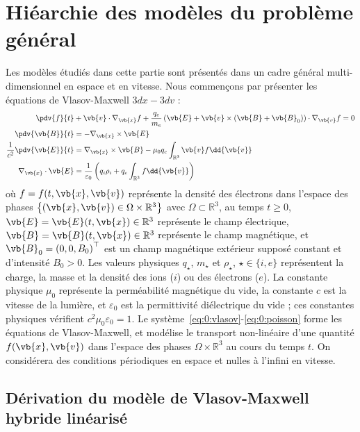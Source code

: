 
\section{Hiéarchie des modèles du problème général}

Les modèles étudiés dans cette partie sont présentés dans un cadre général multi-dimensionnel en espace et en vitesse. Nous commençons par présenter les équations de Vlasov-Maxwell $3dx-3dv$ :
\begin{align}
  \label{eq:0:vlasov}
    \pdv{f}{t} &+ \vb{v}\cdot\nabla_{\vb{x}} f + \frac{q_e}{m_e}\left( \vb{E} + \vb{v}\times(\vb{B}+\vb{B}_0) \right)\cdot\nabla_{\vb{v}} f = 0 \\
  \label{eq:0:maxwellB}
    \pdv{\vb{B}}{t} &= - \nabla_{\vb{x}}\times\vb{E} \\
  \label{eq:0:maxwellE}
    \frac{1}{c^2}\pdv{\vb{E}}{t} &= \nabla_{\vb{x}}\times \vb{B} - \mu_0 q_e\int_{\mathbb{R}^3} \vb{v} f\dd{\vb{v}} \\
  \label{eq:0:poisson}
    \nabla_{\vb{x}}\cdot\vb{E} &= \frac{1}{\varepsilon_0}\left( q_i\rho_i + q_e\int_{\mathbb{R}^3} f\dd{\vb{v}} \right)
\end{align}
où $f=f(t,\vb{x},\vb{v})$ représente la densité des électrons dans l'espace des phases $\left\{ (\vb{x},\vb{v}) \in \Omega\times\mathbb{R}^3 \right\}$ avec $\Omega\subset\mathbb{R}^3$, au temps $t\geq0$, $\vb{E}=\vb{E}(t,\vb{x})\in\mathbb{R}^3$ représente le champ électrique, $\vb{B}=\vb{B}(t,\vb{x})\in\mathbb{R}^3$ représente le champ magnétique, et $\vb{B}_0 = \left(0,0,B_0\right)^\top$ est un champ magnétique extérieur supposé constant et d'intensité $B_0 > 0$. Les valeurs physiques $q_\star$, $m_\star$ et $\rho_\star$, $\star\in\{i,e\}$ représentent la charge, la masse et la densité des ions ($i$) ou des électrons ($e$). La constante physique $\mu_0$ représente la perméabilité magnétique du vide, la constante $c$ est la vitesse de la lumière, et $\varepsilon_0$ est la permittivité diélectrique du vide ; ces constantes physiques vérifient $c^2\mu_0\varepsilon_0=1$. Le système~\eqref{eq:0:vlasov}-\eqref{eq:0:poisson} forme les équations de Vlasov-Maxwell, et modélise le transport non-linéaire d'une quantité $f(\vb{x},\vb{v})$ dans l'espace des phases $\Omega\times\mathbb{R}^3$ au cours du temps $t$. On considérera des conditions périodiques en espace et nulles à l'infini en vitesse.

\subsection{Dérivation du modèle de Vlasov-Maxwell hybride linéarisé}

